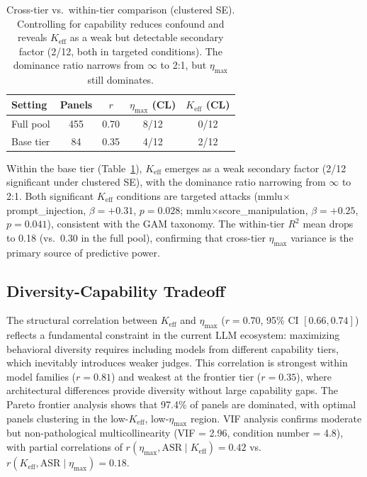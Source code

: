 \documentclass[11pt,a4paper]{article}
\begin{document}
\begin{table}[t]
\centering
\small
\begin{tabular}{lcccc}
\toprule
\textbf{Setting} & \textbf{Panels} & \textbf{$r$} & \textbf{$\eta_{\max}$ (CL)} & \textbf{$K_{\text{eff}}$ (CL)} \\
\midrule
Full pool & 455 & 0.70 & 8/12 & 0/12 \\
Base tier & 84 & 0.35 & 4/12 & 2/12 \\
\bottomrule
\end{tabular}
\caption{Cross-tier vs.\ within-tier comparison (clustered SE). Controlling for capability reduces confound and reveals $K_{\text{eff}}$ as a weak but detectable secondary factor (2/12, both in targeted conditions). The dominance ratio narrows from $\infty$ to 2:1, but $\eta_{\max}$ still dominates.}
\label{tab:capability}
\end{table}

Within the base tier (Table~\ref{tab:capability}), $K_{\text{eff}}$ emerges as a weak secondary factor (2/12 significant under clustered SE), with the dominance ratio narrowing from $\infty$ to 2:1. Both significant $K_{\text{eff}}$ conditions are targeted attacks (mmlu$\times$prompt\_injection, $\beta = +0.31$, $p = 0.028$; mmlu$\times$score\_manipulation, $\beta = +0.25$, $p = 0.041$), consistent with the GAM taxonomy. The within-tier $R^2$ mean drops to 0.18 (vs.\ 0.30 in the full pool), confirming that cross-tier $\eta_{\max}$ variance is the primary source of predictive power.

\subsection{Diversity-Capability Tradeoff}
\label{sec:tradeoff}

The structural correlation between $K_{\text{eff}}$ and $\eta_{\max}$ ($r = 0.70$, 95\% CI $[0.66, 0.74]$) reflects a fundamental constraint in the current LLM ecosystem: maximizing behavioral diversity requires including models from different capability tiers, which inevitably introduces weaker judges. This correlation is strongest within model families ($r = 0.81$) and weakest at the frontier tier ($r = 0.35$), where architectural differences provide diversity without large capability gaps. The Pareto frontier analysis shows that 97.4\% of panels are dominated, with optimal panels clustering in the low-$K_{\text{eff}}$, low-$\eta_{\max}$ region. VIF analysis confirms moderate but non-pathological multicollinearity (VIF = 2.96, condition number = 4.8), with partial correlations of $r(\eta_{\max}, \text{ASR} \mid K_{\text{eff}}) = 0.42$ vs.\ $r(K_{\text{eff}}, \text{ASR} \mid \eta_{\max}) = 0.18$.
\end{document}
